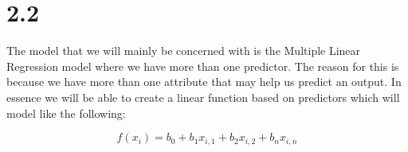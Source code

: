 \documentclass[12pt]{report}
\begin{document}
\section{2.2}

The model that we will mainly be concerned with is the Multiple Linear Regression model where we have more than one predictor. The reason for this is because we have more than one attribute that may help us predict an output. In essence we will be able to create a linear function based on predictors which will model like the following:

\begin{equation*}
	f(x_{i}) = b_{0} + b_{1}x_{i,1} + b_{2}x_{i,2} + b_{n}x_{i,n}
\end{equation*}



\newpage
\end{document}
